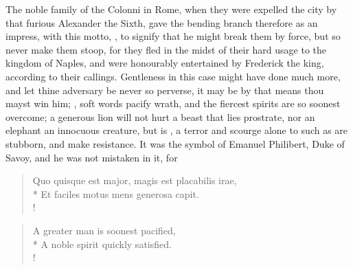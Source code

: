 {The noble family of the Colonni in Rome, when they were expelled the city by that furious Alexander the Sixth, gave the bending branch therefore as an impress, with this motto, , to signify that he might break them by force, but so never make them stoop, for they fled in the midst of their hard usage to the kingdom of Naples, and were honourably entertained by Frederick the king, according to their callings. Gentleness in this case might have done much more, and let thine adversary be never so perverse, it may be by that means thou mayst win him; , soft words pacify wrath, and the fiercest spirits are so soonest overcome; a generous lion will not hurt a beast that lies prostrate, nor an elephant an innocuous creature, but is , a terror and scourge alone to such as are stubborn, and make resistance. It was the symbol of Emanuel Philibert, Duke of Savoy, and he was not mistaken in it, for

%
\begin{latin}%
\begin{verse}%
Quo quisque est major, magis est placabilis irae,\\*
Et faciles motus mens generosa capit.\\!
\end{verse}%
\end{latin}%
\translationrule%
\begin{verse}%
A greater man is soonest pacified,\\*
A noble spirit quickly satisfied.\\!
\end{verse}%

}
